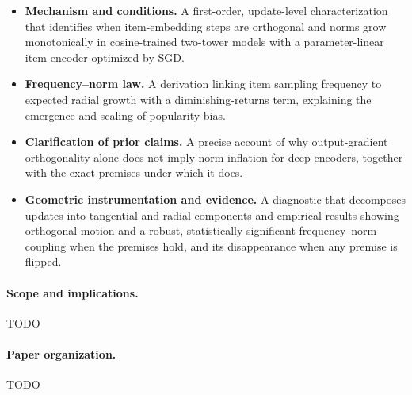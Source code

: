 \begin{itemize}
    \item \textbf{Mechanism and conditions.} A first-order, update-level characterization that identifies when item-embedding steps are orthogonal and norms grow monotonically in cosine-trained two-tower models with a parameter-linear item encoder optimized by SGD.
    \item \textbf{Frequency–norm law.} A derivation linking item sampling frequency to expected radial growth with a diminishing-returns term, explaining the emergence and scaling of popularity bias.
    \item \textbf{Clarification of prior claims.} A precise account of why output-gradient orthogonality alone does not imply norm inflation for deep encoders, together with the exact premises under which it does.
    \item \textbf{Geometric instrumentation and evidence.} A diagnostic that decomposes updates into tangential and radial components and empirical results showing orthogonal motion and a robust, statistically significant frequency–norm coupling when the premises hold, and its disappearance when any premise is flipped.
\end{itemize}

\paragraph{Scope and implications.} TODO

\paragraph{Paper organization.} TODO